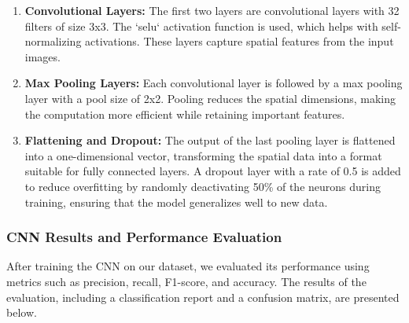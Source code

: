 \documentclass{modeleRapport}
\begin{document}
\begin{enumerate}
    \item \textbf{Convolutional Layers: }The first two layers are convolutional layers with 32 filters of size 3x3. The `selu` 
    activation function is used, which helps with self-normalizing activations. These layers capture spatial features 
    from the input images.
    \item \textbf{Max Pooling Layers: }Each convolutional layer is followed by a max pooling layer with a pool size of 2x2. 
    Pooling reduces the spatial dimensions, making the computation more efficient while retaining important features.
    \item \textbf{Flattening and Dropout: }The output of the last pooling layer is flattened into a one-dimensional vector, 
    transforming the spatial data into a format suitable for fully connected layers. A dropout layer with a rate of 0.5 is 
    added to reduce overfitting by randomly deactivating 50\% of the neurons during training, ensuring that the model 
    generalizes well to new data.
\end{enumerate}





\newpage

\subsubsection{CNN Results and Performance Evaluation}

After training the CNN on our dataset, we evaluated its performance using metrics such as precision, recall, F1-score, 
and accuracy. The results of the evaluation, including a classification report and a confusion matrix, are presented below.
\end{document}
